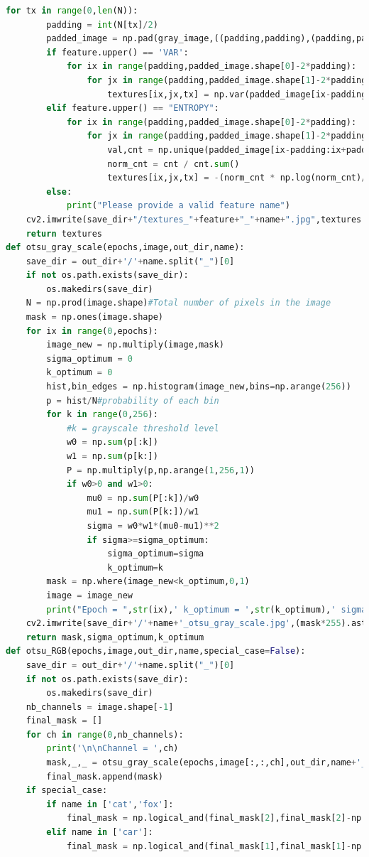 \documentclass{article}
\begin{document}
\begin{lstlisting}[language=Python]
	for tx in range(0,len(N)):
		padding = int(N[tx]/2)
		padded_image = np.pad(gray_image,((padding,padding),(padding,padding)),mode='constant',constant_values=0)
		if feature.upper() == 'VAR':
			for ix in range(padding,padded_image.shape[0]-2*padding):
				for jx in range(padding,padded_image.shape[1]-2*padding):
					textures[ix,jx,tx] = np.var(padded_image[ix-padding:ix+padding+1,jx-padding:jx+padding+1])
		elif feature.upper() == "ENTROPY":
			for ix in range(padding,padded_image.shape[0]-2*padding):
				for jx in range(padding,padded_image.shape[1]-2*padding):
					val,cnt = np.unique(padded_image[ix-padding:ix+padding+1,jx-padding:jx+padding+1], return_counts=True)
					norm_cnt = cnt / cnt.sum()
					textures[ix,jx,tx] = -(norm_cnt * np.log(norm_cnt)/np.log(math.e)).sum()
		else:
			print("Please provide a valid feature name")
	cv2.imwrite(save_dir+"/textures_"+feature+"_"+name+".jpg",textures.astype(np.uint8))
	return textures
def otsu_gray_scale(epochs,image,out_dir,name):
	save_dir = out_dir+'/'+name.split("_")[0]
	if not os.path.exists(save_dir):
		os.makedirs(save_dir)
	N = np.prod(image.shape)#Total number of pixels in the image
	mask = np.ones(image.shape)
	for ix in range(0,epochs):
		image_new = np.multiply(image,mask)
		sigma_optimum = 0
		k_optimum = 0
		hist,bin_edges = np.histogram(image_new,bins=np.arange(256))
		p = hist/N#probability of each bin
		for k in range(0,256):
			#k = grayscale threshold level
			w0 = np.sum(p[:k])
			w1 = np.sum(p[k:])
			P = np.multiply(p,np.arange(1,256,1))
			if w0>0 and w1>0:
				mu0 = np.sum(P[:k])/w0
				mu1 = np.sum(P[k:])/w1
				sigma = w0*w1*(mu0-mu1)**2
				if sigma>=sigma_optimum:
					sigma_optimum=sigma
					k_optimum=k
		mask = np.where(image_new<k_optimum,0,1)
		image = image_new
		print("Epoch = ",str(ix),' k_optimum = ',str(k_optimum),' sigma_optimum = ',str(sigma_optimum))
	cv2.imwrite(save_dir+'/'+name+'_otsu_gray_scale.jpg',(mask*255).astype(np.uint8))
	return mask,sigma_optimum,k_optimum
def otsu_RGB(epochs,image,out_dir,name,special_case=False):
	save_dir = out_dir+'/'+name.split("_")[0]
	if not os.path.exists(save_dir):
		os.makedirs(save_dir)
	nb_channels = image.shape[-1]
	final_mask = []
	for ch in range(0,nb_channels):
		print('\n\nChannel = ',ch)
		mask,_,_ = otsu_gray_scale(epochs,image[:,:,ch],out_dir,name+'_ch_'+str(ch))
		final_mask.append(mask)
	if special_case:
		if name in ['cat','fox']:
			final_mask = np.logical_and(final_mask[2],final_mask[2]-np.logical_and(final_mask[0],final_mask[1]))
		elif name in ['car']:
			final_mask = np.logical_and(final_mask[1],final_mask[1]-np.logical_and(final_mask[2],final_mask[0]))

\end{lstlisting}
\end{document}
